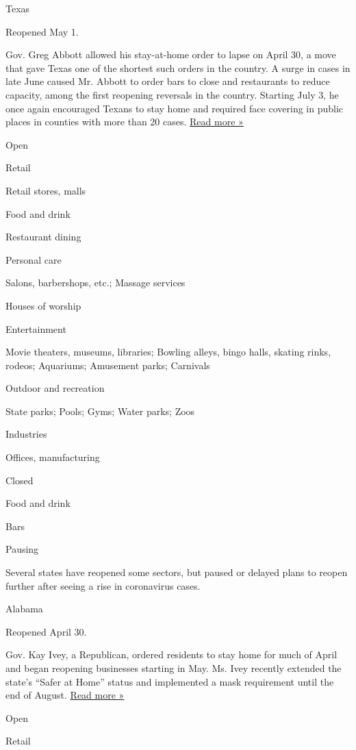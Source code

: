 Texas

Reopened May 1.

Gov. Greg Abbott allowed his stay-at-home order to lapse on April 30, a
move that gave Texas one of the shortest such orders in the country. A
surge in cases in late June caused Mr. Abbott to order bars to close and
restaurants to reduce capacity, among the first reopening reversals in
the country. Starting July 3, he once again encouraged Texans to stay
home and required face covering in public places in counties with more
than 20 cases.
\href{https://www.texastribune.org/2020/06/26/texas-bars-restaurants-coronavirus-greg-abbott/}{Read
more »}

Open

Retail

Retail stores, malls

Food and drink

Restaurant dining

Personal care

Salons, barbershops, etc.; Massage services

Houses of worship

Entertainment

Movie theaters, museums, libraries; Bowling alleys, bingo halls, skating
rinks, rodeos; Aquariums; Amusement parks; Carnivals

Outdoor and recreation

State parks; Pools; Gyms; Water parks; Zoos

Industries

Offices, manufacturing

Closed

Food and drink

Bars

Pausing

Several states have reopened some sectors, but paused or delayed plans
to reopen further after seeing a rise in coronavirus cases.

Alabama

Reopened April 30.

Gov. Kay Ivey, a Republican, ordered residents to stay home for much of
April and began reopening businesses starting in May. Ms. Ivey recently
extended the state's ``Safer at Home'' status and implemented a mask
requirement until the end of August.
\href{https://www.wsfa.com/2020/07/29/gov-ivey-update-public-states-repsonse-covid-/}{Read
more »}

Open

Retail

